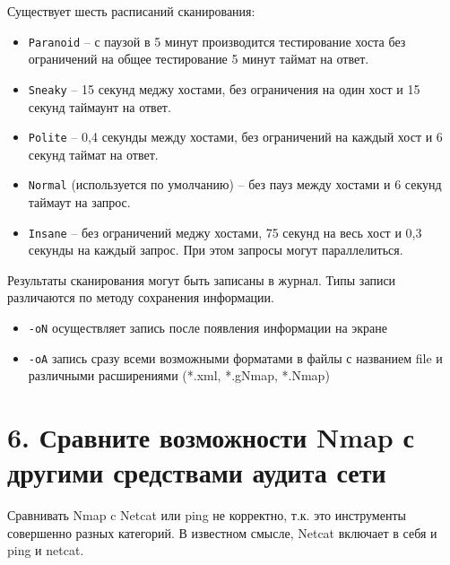 Существует шесть расписаний сканирования:
\begin{itemize}
    \item \texttt{Paranoid} -- с паузой в 5 минут производится тестирование хоста без ограничений на общее тестирование 5 минут таймат на ответ.
    \item \texttt{Sneaky} -- 15 секунд меджу хостами, без ограничения на один хост и 15 секунд таймаунт на ответ.
    \item \texttt{Polite} -- 0,4 секунды между хостами, без ограничений на каждый хост и 6 секунд таймат на ответ.
    \item \texttt{Normal} (используется по умолчанию) -- без пауз между хостами и 6 секунд таймаут на запрос.
    \item \texttt{Insane} -- без ограничений меджу хостами, 75 секунд на весь хост и 0,3 секунды на каждый запрос. При этом запросы могут параллелиться.
\end{itemize}

Результаты сканирования могут быть записаны в журнал. Типы записи различаются по методу сохранения информации.
\begin{itemize}
    \item \texttt{-oN} осуществляет запись после появления информации на экране
    \item \texttt{-oA} запись сразу всеми возможными форматами в файлы с названием file и различными расширениями (*.xml, *.gNmap, *.Nmap)
\end{itemize}

\section*{6. Сравните возможности Nmap с другими средствами аудита сети}

Сравнивать Nmap c Netcat или ping не корректно, т.к. это инструменты совершенно разных категорий. В известном смысле, Netcat включает в себя и ping и netcat.

